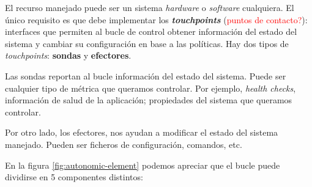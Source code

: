 El recurso manejado puede ser un sistema \emph{hardware} o \emph{software} cualquiera. El único requisito es que debe implementar los \textbf{\emph{touchpoints}} (\textcolor{red}{puntos de contacto?}): interfaces que permiten al bucle de control obtener información del estado del sistema y cambiar su configuración en base a las políticas. Hay dos tipos de \emph{touchpoints}: \textbf{sondas} y \textbf{efectores}.

Las sondas reportan al bucle información del estado del sistema. Puede ser cualquier tipo de métrica que queramos controlar. Por ejemplo, \emph{health checks}, información de salud de la aplicación; propiedades del sistema que queramos controlar.

Por otro lado, los efectores, nos ayudan a modificar el estado del sistema manejado. Pueden ser ficheros de configuración, comandos, etc.

En la figura \ref{fig:autonomic-element} podemos apreciar que el bucle puede dividirse en 5 componentes distintos: \cite{ibmcorporationArchitecturalBlueprintAutonomic2006}

